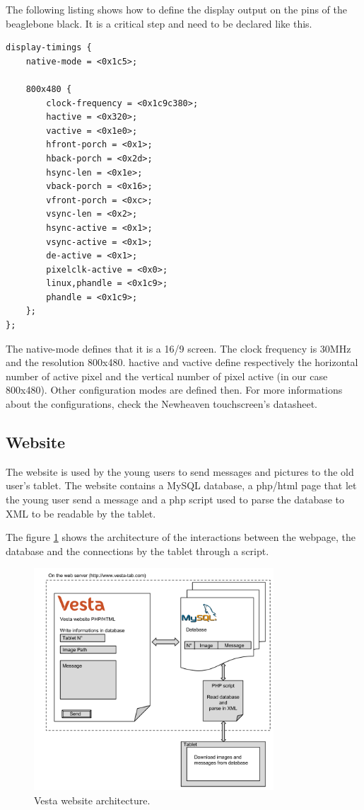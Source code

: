The following listing shows how to define the display output on the pins of the beaglebone black. It is a critical step and need to be declared like this.
\begin{lstlisting}
display-timings {
	native-mode = <0x1c5>;

	800x480 {
		clock-frequency = <0x1c9c380>;
		hactive = <0x320>;
		vactive = <0x1e0>;
		hfront-porch = <0x1>;
		hback-porch = <0x2d>;
		hsync-len = <0x1e>;
		vback-porch = <0x16>;
		vfront-porch = <0xc>;
		vsync-len = <0x2>;
		hsync-active = <0x1>;
		vsync-active = <0x1>;
		de-active = <0x1>;
		pixelclk-active = <0x0>;
		linux,phandle = <0x1c9>;
		phandle = <0x1c9>;
	};
};
\end{lstlisting}

The native-mode defines that it is a 16/9 screen. The clock frequency is 30MHz and the resolution 800x480. hactive and vactive define respectively the horizontal number of active pixel and the vertical number of pixel active (in our case 800x480). Other configuration modes are defined then. For more informations about the configurations, check the Newheaven touchscreen's datasheet.

\clearpage

\subsection{Website}

The website is used by the young users to send messages and pictures to the old user’s tablet.
The website contains a MySQL database, a php/html page that let the young user send a message and a php script used to parse the database to XML to be readable by the tablet.

The figure \ref{fig:web archi} shows the architecture of the interactions between the webpage, the database and the connections by the tablet through a script.

\begin{figure}[!htb]
    \centering
    \includegraphics[width=0.8\textwidth,keepaspectratio]{chap/softFig/vesta_website2}
    \caption{Vesta website architecture.}
    \label{fig:web archi}
\end{figure}

